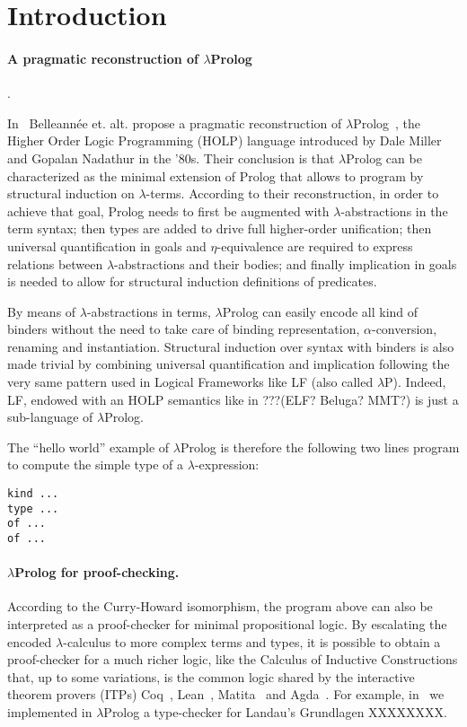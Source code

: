 \documentclass{easychair}
\begin{document}
\section{Introduction}

\paragraph{A pragmatic reconstruction of $\lambda$Prolog}.

In~\cite{jlp98} Belleannée et. alt. propose a pragmatic reconstruction of $\lambda$Prolog~\cite{lambdap1,lambdap2,lambdap3}, the Higher Order Logic Programming (HOLP) language introduced by Dale Miller and Gopalan Nadathur in the '80s.
Their conclusion is that $\lambda$Prolog can be characterized as the minimal extension of Prolog that allows to program by structural induction on $\lambda$-terms. According to their reconstruction, in order to achieve that goal, Prolog needs to first be augmented with $\lambda$-abstractions in the term syntax; then types are added to drive full higher-order unification; then universal quantification in goals and $\eta$-equivalence are required to express relations between $\lambda$-abstractions and their bodies; and finally implication in goals is needed to allow for structural induction definitions of predicates.

By means of $\lambda$-abstractions in terms, $\lambda$Prolog can easily encode all kind of binders without the need to take care of binding representation, $\alpha$-conversion, renaming and instantiation. Structural induction over syntax with binders is also made trivial by combining universal quantification and implication following the very same pattern used in Logical Frameworks like LF (also called $\lambda$P). Indeed, LF, endowed with an HOLP semantics like in ???(ELF? Beluga? MMT?) is just a sub-language of $\lambda$Prolog.

The ``hello world'' example of $\lambda$Prolog is therefore the following two lines program to compute the simple type of a $\lambda$-expression:

\begin{verbatim}
kind ...
type ...
of ...
of ...
\end{verbatim}

\paragraph{$\lambda$Prolog for proof-checking.}

According to the Curry-Howard isomorphism, the program above can also be interpreted as a proof-checker for minimal propositional logic. By escalating the encoded $\lambda$-calculus to more complex terms and types, it is possible to obtain a proof-checker for a much richer logic, like the Calculus of Inductive Constructions that, up to some variations, is the common logic shared by the interactive theorem provers (ITPs) Coq~\cite{}, Lean~\cite{}, Matita~\cite{} and Agda~\cite{}. For example, in~\cite{us} we implemented in $\lambda$Prolog a type-checker for Landau's Grundlagen XXXXXXXX.
\end{document}
